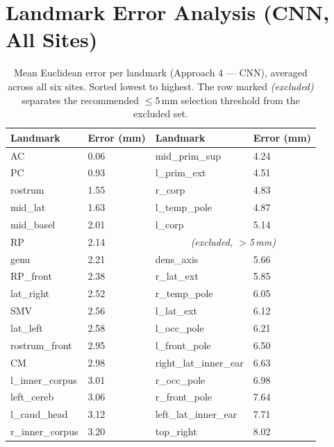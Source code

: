 \documentclass[11pt,letterpaper]{article}
\begin{document}
\newpage
\section{Landmark Error Analysis (CNN, All Sites)}
\label{app:landmarks}

\begin{table}[h]
\centering
\caption{Mean Euclidean error per landmark (Approach 4 — CNN), averaged across all six sites.
Sorted lowest to highest. The row marked \textit{(excluded)} separates the
recommended $\leq$5\,mm selection threshold from the excluded set.}
\label{tab:landmark_errors}
\small
\begin{tabular}{llll}
\toprule
\textbf{Landmark} & \textbf{Error (mm)} & \textbf{Landmark} & \textbf{Error (mm)} \\
\midrule
AC                     & 0.06 & mid\_prim\_sup         & 4.24 \\
PC                     & 0.93 & l\_prim\_ext           & 4.51 \\
rostrum                & 1.55 & r\_corp                & 4.83 \\
mid\_lat               & 1.63 & l\_temp\_pole          & 4.87 \\
mid\_basel             & 2.01 & l\_corp                & 5.14 \\
RP                     & 2.14 & \multicolumn{2}{c}{\textit{(excluded, $>$5\,mm)}} \\
genu                   & 2.21 & dens\_axis             & 5.66 \\
RP\_front              & 2.38 & r\_lat\_ext            & 5.85 \\
lat\_right             & 2.52 & r\_temp\_pole          & 6.05 \\
SMV                    & 2.56 & l\_lat\_ext            & 6.12 \\
lat\_left              & 2.58 & l\_occ\_pole           & 6.21 \\
rostrum\_front         & 2.95 & l\_front\_pole         & 6.50 \\
CM                     & 2.98 & right\_lat\_inner\_ear & 6.63 \\
l\_inner\_corpus       & 3.01 & r\_occ\_pole           & 6.98 \\
left\_cereb            & 3.06 & r\_front\_pole         & 7.64 \\
l\_caud\_head          & 3.12 & left\_lat\_inner\_ear  & 7.71 \\
r\_inner\_corpus       & 3.20 & top\_right             & 8.02 \\

\end{tabular}
\end{table}
\end{document}
